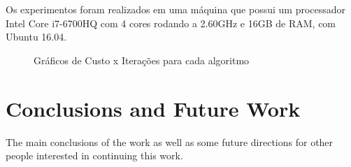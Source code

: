 \documentclass[conference]{IEEEtran}
\begin{document}
Os experimentos foram realizados em uma máquina que possui um processador Intel Core i7-6700HQ com 4 cores rodando a 2.60GHz e 16GB de RAM, com Ubuntu 16.04.

\begin{figure}[h]
	\centering

  \caption{Gráficos de Custo x Iterações para cada algoritmo}
	\label{fig:results}
\end{figure}



\section{Conclusions and Future Work}

The main conclusions of the work as well as some future directions for other people interested in continuing this work.



\end{document}
